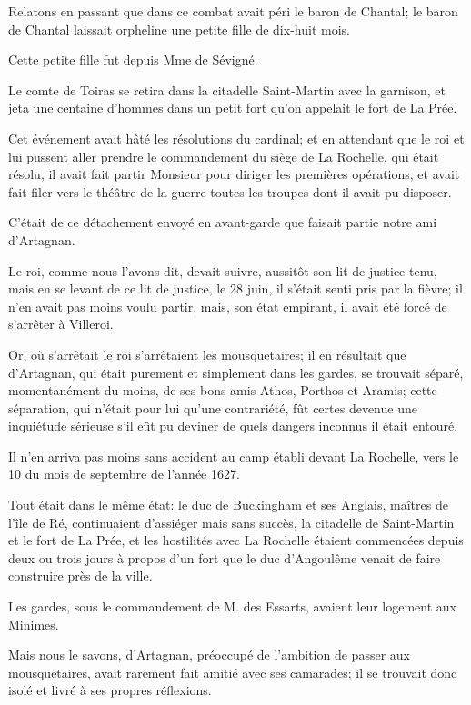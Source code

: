 Relatons en passant que dans ce combat avait péri le baron de Chantal; le baron de Chantal laissait orpheline une petite fille de dix-huit mois. 

Cette petite fille fut depuis Mme de Sévigné. 

Le comte de Toiras se retira dans la citadelle Saint-Martin avec la garnison, et jeta une centaine d'hommes dans un petit fort qu'on appelait le fort de La Prée. 

Cet événement avait hâté les résolutions du cardinal; et en attendant que le roi et lui pussent aller prendre le commandement du siège de La Rochelle, qui était résolu, il avait fait partir Monsieur pour diriger les premières opérations, et avait fait filer vers le théâtre de la guerre toutes les troupes dont il avait pu disposer. 

C'était de ce détachement envoyé en avant-garde que faisait partie notre ami d'Artagnan. 

Le roi, comme nous l'avons dit, devait suivre, aussitôt son lit de justice tenu, mais en se levant de ce lit de justice, le 28 juin, il s'était senti pris par la fièvre; il n'en avait pas moins voulu partir, mais, son état empirant, il avait été forcé de s'arrêter à Villeroi. 

Or, où s'arrêtait le roi s'arrêtaient les mousquetaires; il en résultait que d'Artagnan, qui était purement et simplement dans les gardes, se trouvait séparé, momentanément du moins, de ses bons amis Athos, Porthos et Aramis; cette séparation, qui n'était pour lui qu'une contrariété, fût certes devenue une inquiétude sérieuse s'il eût pu deviner de quels dangers inconnus il était entouré. 

Il n'en arriva pas moins sans accident au camp établi devant La Rochelle, vers le 10 du mois de septembre de l'année 1627. 

Tout était dans le même état: le duc de Buckingham et ses Anglais, maîtres de l'île de Ré, continuaient d'assiéger mais sans succès, la citadelle de Saint-Martin et le fort de La Prée, et les hostilités avec La Rochelle étaient commencées depuis deux ou trois jours à propos d'un fort que le duc d'Angoulême venait de faire construire près de la ville. 

Les gardes, sous le commandement de M. des Essarts, avaient leur logement aux Minimes. 

Mais nous le savons, d'Artagnan, préoccupé de l'ambition de passer aux mousquetaires, avait rarement fait amitié avec ses camarades; il se trouvait donc isolé et livré à ses propres réflexions. 

